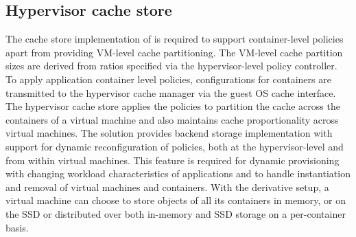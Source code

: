 \subsection{Hypervisor cache store}
%
The cache store implementation of \dd{} %
is required to support container-level policies apart from 
providing VM-level cache partitioning. 
%
The VM-level cache partition sizes are derived from 
ratios specified via the hypervisor-level policy controller.
%
To apply application container level policies, configurations for
containers are transmitted to the hypervisor cache manager
via the guest OS cache interface.
%
%
The hypervisor cache store applies the policies to partition the
cache across the containers of a virtual machine and also maintains
cache proportionality across virtual machines.
%
The \dd{} solution provides backend storage implementation with
support for dynamic reconfiguration of policies, both at the
hypervisor-level and from within virtual machines. 
%
This feature is required
for dynamic provisioning with changing workload characteristics of
applications and to handle instantiation and removal of virtual
machines and containers.
%
With the derivative setup, a virtual machine can choose to store
objects of all its containers in memory, or on the SSD or 
distributed over both in-memory and SSD storage 
on a per-container basis.
%

